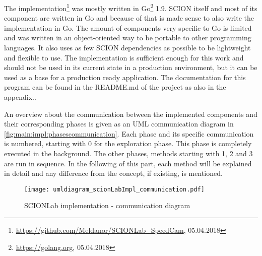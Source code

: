 \documentclass[thesis.tex]{subfiles}
\begin{document}
The implementation\footnote{\url{https://github.com/Meldanor/SCIONLab_SpeedCam}, 05.04.2018} was mostly written in Go\footnote{\url{https://golang.org}, 05.04.2018} 1.9. SCION itself and most of its component are written in Go and because of that is made sense to also write the implementation in Go. The amount of components very specific to Go is limited and was written in an object-oriented way to be portable to other programming languages. It also uses as few SCION dependencies as possible to be lightweight and flexible to use. The implementation is sufficient enough for this work and should not be used in its current state in a production environment, but it can be used as a base for a production ready application. The documentation for this program can be found in the README.md of the project as also in the appendix..

An overview about the communication between the implemented components and their corresponding phases is given as an UML communication diagram in \autoref{fig:main:impl:phasescommunication}. Each phase and its specific communication is numbered, starting with 0 for the exploration phase. This phase is completely executed in the background. The other phases, methods starting with 1, 2 and 3 are run in sequence. In the following of this part, each method will be explained in detail and any difference from the concept, if existing, is mentioned.

\begin{figure}
	\centering
	\texttt{[image: umldiagram\_scionLabImpl\_communication.pdf]}
	\caption{SCIONLab implementation - communication diagram}
	\label{fig:main:impl:phasescommunication}
\end{figure}
\end{document}
